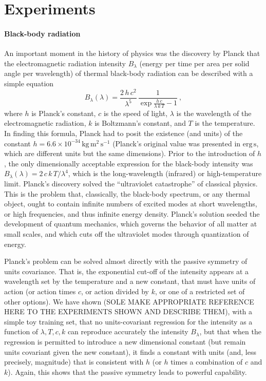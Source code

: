 \documentclass{article}
\theoremstyle{plain}
\theoremstyle{definition}
\theoremstyle{remark}
\newcommand{\unit}[1]{\mathrm{#1}}
\newcommand{\kg}{\unit{kg}}
\newcommand{\m}{\unit{m}}
\newcommand{\s}{\unit{s}}
\begin{document}
\section{Experiments}\label{sec:experiments}

\paragraph{Black-body radiation}
An important moment in the history of physics was the discovery by Planck that the electromagnetic radiation intensity $B_\lambda$ (energy per time per area per solid angle per wavelength) of thermal black-body radiation can be described with a simple equation \cite{planck}
\begin{equation}
    B_\lambda(\lambda) = \frac{2\,h\,c^2}{\lambda^5}\,\frac{1}{\exp\frac{h\,c}{\lambda\,k\,T} - 1}~,
\end{equation}
where $h$ is Planck's constant,
$c$ is the speed of light,
$\lambda$ is the wavelength of the electromagnetic radiation,
$k$ is Boltzmann's constant,
and $T$ is the temperature.
In finding this formula, Planck had to posit the existence (and units) of the constant $h=6.6\times 10^{-34}\,\kg\,\m^2\,\s^{-1}$ (Planck's original value was presented in $\mathrm{erg}\,\s$, which are different units but the same dimensions).
Prior to the introduction of $h$, the only dimensionally acceptable expression for the black-body intensity was $B_\lambda(\lambda)=2\,c\,k\,T/\lambda^4$, which is the long-wavelength (infrared) or high-temperature limit.
Planck's discovery solved the ``ultraviolet catastrophe'' of classical physics.
This is the problem that, classically, the black-body spectrum, or any thermal object, ought to contain infinite numbers of excited modes at short wavelengths, or high frequencies, and thus infinite energy density.
Planck's solution seeded the development of quantum mechanics, which governs the behavior of all matter at small scales, and which cuts off the ultraviolet modes through quantization of energy.

Planck's problem can be solved almost directly with the passive symmetry of units covariance.
That is, the exponential cut-off of the intensity appears at a wavelength set by the temperature and a new constant, that must have units of action (or action times $c$, or action divided by $k$, or one of a restricted set of other options).
We have shown (SOLE MAKE APPROPRIATE REFERENCE HERE TO THE EXPERIMENTS SHOWN AND DESCRIBE THEM), with a simple toy training set, that no units-covariant regression for the intensity as a function of $\lambda, T, c, k$ can reproduce accurately the intensity $B_\lambda$, but that when the regression is permitted to introduce a new dimensional constant (but remain units covariant given the new constant), it finds a constant with units (and, less precisely, magnitude) that is consistent with $h$ (or $h$ times a combination of $c$ and $k$).
Again, this shows that the passive symmetry leads to powerful capability.
\end{document}
